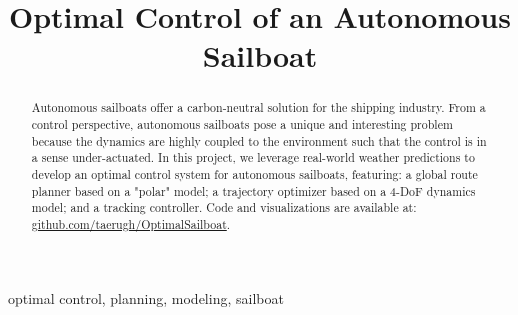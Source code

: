\documentclass[conference]{IEEEtran}
\begin{document}
\title{Optimal Control of an Autonomous Sailboat}

\author{
\and
{}
\and
{}
\and
{}
\and
{}
}

\maketitle

\begin{abstract}
Autonomous sailboats offer a carbon-neutral solution for the shipping industry. From a control perspective, autonomous sailboats pose a unique and interesting problem because the dynamics are highly coupled to the environment such that the control is in a sense under-actuated. In this project, we leverage real-world weather predictions to develop an optimal control system for autonomous sailboats, featuring: a global route planner based on a "polar" model; a trajectory optimizer based on a 4-DoF dynamics model; and a tracking controller. Code and visualizations are available at: \href{https://github.com/taerugh/OptimalSailboat}{github.com/taerugh/OptimalSailboat}.
\end{abstract}

\begin{IEEEkeywords}
optimal control, planning, modeling, sailboat
\end{IEEEkeywords}
\end{document}

